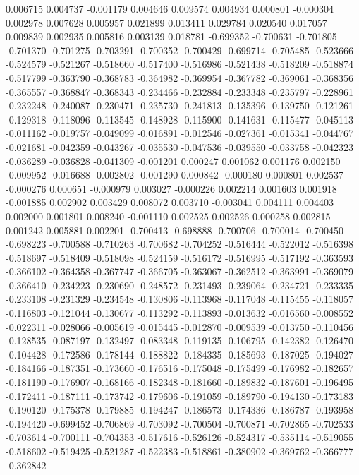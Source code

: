 0.006715
0.004737
-0.001179
0.004646
0.009574
0.004934
0.000801
-0.000304
0.002978
0.007628
0.005957
0.021899
0.013411
0.029784
0.020540
0.017057
0.009839
0.002935
0.005816
0.003139
0.018781
-0.699352
-0.700631
-0.701805
-0.701370
-0.701275
-0.703291
-0.700352
-0.700429
-0.699714
-0.705485
-0.523666
-0.524579
-0.521267
-0.518660
-0.517400
-0.516986
-0.521438
-0.518209
-0.518874
-0.517799
-0.363790
-0.368783
-0.364982
-0.369954
-0.367782
-0.369061
-0.368356
-0.365557
-0.368847
-0.368343
-0.234466
-0.232884
-0.233348
-0.235797
-0.228961
-0.232248
-0.240087
-0.230471
-0.235730
-0.241813
-0.135396
-0.139750
-0.121261
-0.129318
-0.118096
-0.113545
-0.148928
-0.115900
-0.141631
-0.115477
-0.045113
-0.011162
-0.019757
-0.049099
-0.016891
-0.012546
-0.027361
-0.015341
-0.044767
-0.021681
-0.042359
-0.043267
-0.035530
-0.047536
-0.039550
-0.033758
-0.042323
-0.036289
-0.036828
-0.041309
-0.001201
0.000247
0.001062
0.001176
0.002150
-0.009952
-0.016688
-0.002802
-0.001290
0.000842
-0.000180
0.000801
0.002537
-0.000276
0.000651
-0.000979
0.003027
-0.000226
0.002214
0.001603
0.001918
-0.001885
0.002902
0.003429
0.008072
0.003710
-0.003041
0.004111
0.004403
0.002000
0.001801
0.008240
-0.001110
0.002525
0.002526
0.000258
0.002815
0.001242
0.005881
0.002201
-0.700413
-0.698888
-0.700706
-0.700014
-0.700450
-0.698223
-0.700588
-0.710263
-0.700682
-0.704252
-0.516444
-0.522012
-0.516398
-0.518697
-0.518409
-0.518098
-0.524159
-0.516172
-0.516995
-0.517192
-0.363593
-0.366102
-0.364358
-0.367747
-0.366705
-0.363067
-0.362512
-0.363991
-0.369079
-0.366410
-0.234223
-0.230690
-0.248572
-0.231493
-0.239064
-0.234721
-0.233335
-0.233108
-0.231329
-0.234548
-0.130806
-0.113968
-0.117048
-0.115455
-0.118057
-0.116803
-0.121044
-0.130677
-0.113292
-0.113893
-0.013632
-0.016560
-0.008552
-0.022311
-0.028066
-0.005619
-0.015445
-0.012870
-0.009539
-0.013750
-0.110456
-0.128535
-0.087197
-0.132497
-0.083348
-0.119135
-0.106795
-0.142382
-0.126470
-0.104428
-0.172586
-0.178144
-0.188822
-0.184335
-0.185693
-0.187025
-0.194027
-0.184166
-0.187351
-0.173660
-0.176516
-0.175048
-0.175499
-0.176982
-0.182657
-0.181190
-0.176907
-0.168166
-0.182348
-0.181660
-0.189832
-0.187601
-0.196495
-0.172411
-0.187111
-0.173742
-0.179606
-0.191059
-0.189790
-0.194130
-0.173183
-0.190120
-0.175378
-0.179885
-0.194247
-0.186573
-0.174336
-0.186787
-0.193958
-0.194420
-0.699452
-0.706869
-0.703092
-0.700504
-0.700871
-0.702865
-0.702533
-0.703614
-0.700111
-0.704353
-0.517616
-0.526126
-0.524317
-0.535114
-0.519055
-0.518602
-0.519425
-0.521287
-0.522383
-0.518861
-0.380902
-0.369762
-0.366777
-0.362842
